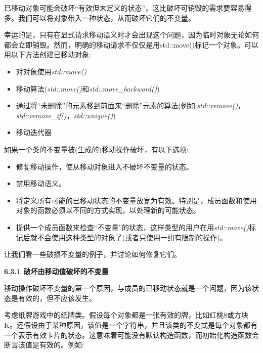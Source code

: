 已移动对象可能会破坏“有效但未定义的状态”，这比破坏可销毁的需求要容易得多。我们可以将对象带入一种状态，从而破坏它们的不变量。\par

幸运的是，只有在显式请求移动语义时才会出现这个问题，因为临时对象无论如何都会立即销毁。然而，明确的移动请求不仅仅是用std::move()标记一个对象。可以用以下方法创建已移动对象:\par

\begin{itemize}
	\item 对对象使用\textit{std::move()}
	\item 移动算法(\textit{std::move()}和\textit{std::move\_backward()})
	\item 通过将“未删除”的元素移到前面来“删除”元素的算法(例如:\textit{std::remove()}，\textit{std::remove\_if()}，\textit{std::unique()})
	\item 移动迭代器
\end{itemize}

如果一个类的不变量被(生成的)移动操作破坏，有以下选项:\par

\begin{itemize}
	\item 修复移动操作，使从移动对象进入不破坏不变量的状态。
	\item 禁用移动语义。
	\item 将定义所有可能的已移动状态的不变量放宽为有效。特别是，成员函数和使用对象的函数必须以不同的方式实现，以处理新的可能状态。
	\item 提供一个成员函数来检查“不变量”的状态，这样类型的用户在用\textit{std::move()}标记后就不会使用这种类型的对象了(或者只使用一组有限制的操作)。
\end{itemize}

让我们看一些破损不变量的例子，并讨论如何修复它们。\par

\hspace*{\fill} \par %
\textbf{6.3.1 破坏由移动值破坏的不变量}

移动操作破坏不变量的第一个原因，与成员的已移动状态就是一个问题，因为该状态是有效的，但不应该发生。\par

考虑纸牌游戏中的纸牌类。假设每个对象都是一张有效的牌，比如红桃8或方块K。还假设由于某种原因，该值是一个字符串，并且该类的不变式是每个对象都有一个表示有效卡片的状态。这意味着可能没有默认构造函数，而初始化构造函数会断言该值是有效的。例如:\par

